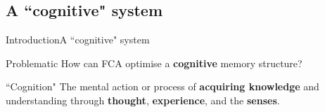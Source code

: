 \subsection{A ``cognitive" system}
\begin{frame}{Introduction}{A ``cognitive" system}


\begin{block}{Problematic}
{
How can FCA  optimise a \textbf{cognitive} memory structure?
}
\end{block}

\vfill

\begin{block}{``Cognition"}
{
  The mental action or process of \textbf{acquiring knowledge} and 
  understanding through \textbf{thought}, \textbf{experience}, and the 
  \textbf{senses}.
}
\vfill
\hspace*{}
\end{block}

\end{frame}


